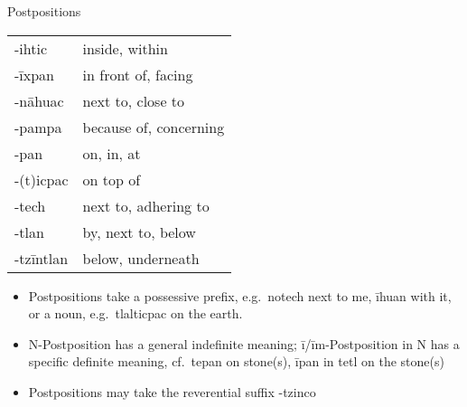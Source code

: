 \documentclass[12pt]{beamer}
\newcommand{\nah}[1]{\textcolor{nahgrn}{#1}}
\newcommand{\trs}[1]{\textcolor{nahblu}{#1}}
\begin{document}
\begin{frame}
\begin{columns}[t]
\begin{column}{.23\linewidth}
\begin{block}{Postpositions}
\begin{tabular}{ll}
          \nah{-ihtic} & \trs{inside, within} \\
          \nah{-īxpan} & \trs{in front of, facing} \\
          \nah{-nāhuac} & \trs{next to, close to} \\
          \nah{-pampa} & \trs{because of, concerning} \\
          \nah{-pan} & \trs{on, in, at} \\
          \nah{-(t)icpac} & \trs{on top of} \\
          \nah{-tech} & \trs{next to, adhering to} \\
          \nah{-tlan} & \trs{by, next to, below} \\
          \nah{-tzīntlan} & \trs{below, underneath} \\
        \end{tabular}%
        \begin{itemize}
        \item Postpositions take a possessive prefix, e.g.~\nah{notech} \trs{next to me}, \nah{īhuan} \trs{with it}, or a noun, e.g.~\nah{tlalticpac} \trs{on the earth}.
        \item         N-Postposition has a general indefinite meaning; \nah{ī/īm}-Postposition \nah{in} N has a specific definite meaning, cf.~\nah{tepan} \trs{on stone(s)}, \nah{īpan in tetl} \trs{on the stone(s)}
        \item Postpositions may take the reverential suffix \nah{-tzinco}
        \end{itemize}
      \end{block}
    \end{column}
  \end{columns}
\end{frame}
\end{document}
